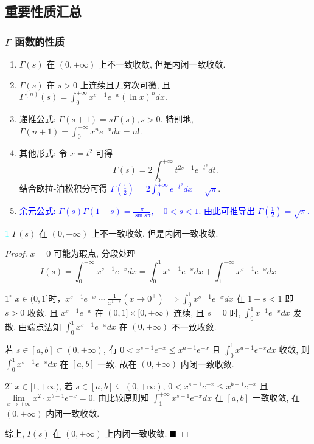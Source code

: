 \documentclass[lang=cn,newtx,10pt,scheme=chinese]{elegantbook}
\begin{document}
\subsection{重要性质汇总}
\subsubsection{$\Gamma$ 函数的性质}

\begin{enumerate}
    \item $\Gamma(s)$ 在 $(0, +\infty)$ 上不一致收敛, 但是内闭一致收敛.

    \item $\Gamma(s)$ 在 $s>0$ 上连续且无穷次可微, 且 $\Gamma^{(n)}(s) = \int_{0}^{+\infty} x^{s-1}e^{-x}(\ln x)^n dx$.

    \item 递推公式: $\Gamma(s+1)=s\Gamma(s), s>0$. 特别地, $\Gamma(n+1) = \int_0^{+\infty} x^n e^{-x} dx = n!$.

    \item 其他形式: 令 $x=t^2$ 可得
    $$ \Gamma(s) = 2 \int_0^{+\infty} t^{2s-1}e^{-t^2} dt. $$
    结合欧拉-泊松积分可得 \textcolor{blue}{$\Gamma\left(\frac{1}{2}\right) = 2\int_0^{+\infty} e^{-t^2} dx = \sqrt{\pi}$}.

    \item \textcolor{blue}{余元公式: $\Gamma(s)\Gamma(1-s) = \frac{\pi}{\sin s\pi}, \quad 0 < s < 1$. 由此可推导出 $\Gamma\left(\frac{1}{2}\right) = \sqrt{\pi}$.}
\end{enumerate}

\begin{property}\textcolor{cyan}{1}
$\Gamma(s)$ 在 $(0, +\infty)$ 上不一致收敛, 但是内闭一致收敛.
\end{property}

\begin{proof}
$x=0$ 可能为瑕点, 分段处理
$$ I(s) = \int_0^{+\infty} x^{s-1}e^{-x}dx = \int_0^1 x^{s-1}e^{-x}dx + \int_1^{+\infty} x^{s-1}e^{-x}dx $$

$1^{\circ}$ $x \in (0, 1] $时，$ x^{s-1}e^{-x} \sim \frac{1}{x^{1-s}} (x \to 0^+) \implies \int_0^1 x^{s-1}e^{-x}dx$ 在 $1-s<1$ 即 $s>0$ 收敛.
且 $x^{s-1}e^{-x}$ 在 $(0,1] \times [0, +\infty)$ 连续, 且 $s=0$ 时, $\int_0^1 x^{-1}e^{-x}dx$ 发散.
由端点法知 $\int_0^1 x^{s-1}e^{-x}dx$ 在 $(0, +\infty)$ 不一致收敛.

若 $s \in [a,b] \subset (0, +\infty)$, 有 $0 < x^{s-1}e^{-x} \le x^{a-1}e^{-x}$ 且 $\int_0^1 x^{a-1}e^{-x}dx$ 收敛,
则 $\int_0^1 x^{s-1}e^{-x}dx$ 在 $[a,b]$ 一致, 故在 $(0, +\infty)$ 内闭一致收敛.

$2^{\circ}$ $x \in [1, +\infty)$, 若 $s \in [a,b] \subseteq (0, +\infty)$, $0 < x^{s-1}e^{-x} \le x^{b-1}e^{-x}$ 且 $\lim\limits_{x\to+\infty} x^2 \cdot x^{b-1}e^{-x}=0$.
由比较原则知 $\int_1^{+\infty} x^{s-1}e^{-x}dx$ 在 $[a,b]$ 一致收敛, 在 $(0, +\infty)$ 内闭一致收敛.

综上, $I(s)$ 在 $(0, +\infty)$ 上内闭一致收敛.
$\hfill \blacksquare$
\end{proof}
\end{document}
